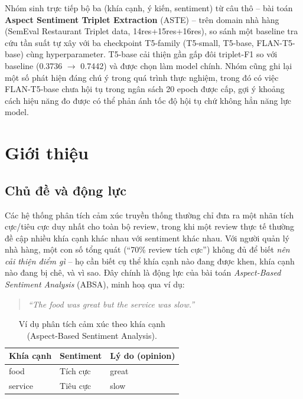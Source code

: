 \documentclass[11pt,a4paper]{article}
\begin{document}
Nhóm sinh trực tiếp bộ ba (khía cạnh, ý kiến, sentiment) từ câu thô -- bài toán
\textbf{Aspect Sentiment Triplet Extraction} (ASTE) -- trên domain nhà hàng
(SemEval Restaurant Triplet data, 14res+15res+16res), so sánh một baseline tra
cứu tần suất tự xây với ba checkpoint T5-family (T5-small, T5-base,
FLAN-T5-base) cùng hyperparameter. T5-base cải thiện gần gấp đôi triplet-F1 so
với baseline (0.3736 $\to$ 0.7442) và được chọn làm model chính. Nhóm cũng ghi
lại một số phát hiện đáng chú ý trong quá trình thực nghiệm, trong đó có việc
FLAN-T5-base chưa hội tụ trong ngân sách 20 epoch được cấp, gợi ý khoảng cách
hiệu năng đo được có thể phản ánh tốc độ hội tụ chứ không hẳn năng lực model.

\clearpage
\section{Giới thiệu}

\subsection{Chủ đề và động lực}

Các hệ thống phân tích cảm xúc truyền thống thường chỉ đưa ra một nhãn
tích cực/tiêu cực duy nhất cho toàn bộ review, trong khi một review thực tế
thường đề cập nhiều khía cạnh khác nhau với sentiment khác nhau. Với người quản
lý nhà hàng, một con số tổng quát (``70\% review tích cực'') không đủ để biết
\emph{nên cải thiện điểm gì} -- họ cần biết cụ thể khía cạnh nào đang được
khen, khía cạnh nào đang bị chê, và vì sao. Đây chính là động lực của bài toán
\emph{Aspect-Based Sentiment Analysis} (ABSA), minh hoạ qua ví dụ:

\begin{quote}
\emph{``The food was great but the service was slow.''}
\end{quote}

\begin{table}[h]
\centering
\begin{tabular}{lll}
\toprule
Khía cạnh & Sentiment & Lý do (opinion) \\
\midrule
food & Tích cực & great \\
service & Tiêu cực & slow \\
\bottomrule
\end{tabular}
\caption{Ví dụ phân tích cảm xúc theo khía cạnh (Aspect-Based Sentiment Analysis).}
\end{table}
\end{document}
